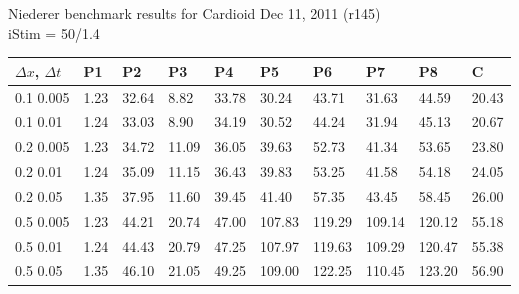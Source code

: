 \documentclass{article}
\begin{document}
\begin{center}
  {\Large  Niederer benchmark results for Cardioid Dec 11, 2011 (r145)\\
    iStim = 50/1.4\\[20pt]}

  \begin{tabular}{l|lllllllll}
    $\Delta x$, $\Delta t$ & P1 &P2 & P3 & P4 & P5 & P6 & P7 & P8 & C \\
    \hline
    0.1 0.005 &   1.23 &  32.64 &   8.82 &  33.78 &  30.24 &  43.71 &  31.63 &  44.59 &  20.43\\
    \hline
    0.1 0.01 &   1.24 &  33.03 &   8.90 &  34.19 &  30.52 &  44.24 &  31.94 &  45.13 &  20.67\\
    \hline
    0.2 0.005 &   1.23 &  34.72 &  11.09 &  36.05 &  39.63 &  52.73 &  41.34 &  53.65 &  23.80\\
    \hline
    0.2 0.01 &   1.24 &  35.09 &  11.15 &  36.43 &  39.83 &  53.25 &  41.58 &  54.18 &  24.05\\
    \hline
    0.2 0.05 &   1.35 &  37.95 &  11.60 &  39.45 &  41.40 &  57.35 &  43.45 &  58.45 &  26.00\\
    \hline
    0.5 0.005 &   1.23 &  44.21 &  20.74 &  47.00 & 107.83 & 119.29 & 109.14 & 120.12 &  55.18\\
    \hline
    0.5 0.01 &   1.24 &  44.43 &  20.79 &  47.25 & 107.97 & 119.63 & 109.29 & 120.47 &  55.38\\
    \hline
    0.5 0.05 &   1.35 &  46.10 &  21.05 &  49.25 & 109.00 & 122.25 & 110.45 & 123.20 &  56.90\\
    \hline
  \end{tabular}
\end{center}

\vspace{24pt}
\end{document}
